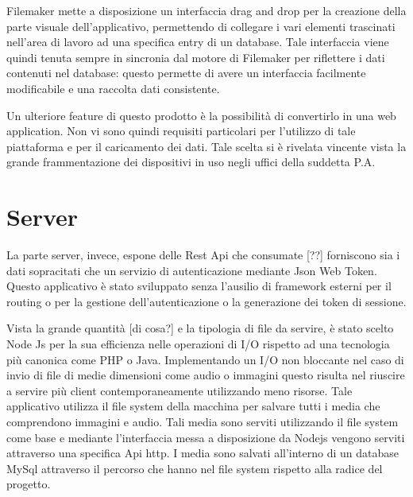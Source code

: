 Filemaker mette a disposizione un interfaccia drag and drop per la creazione della parte visuale dell'applicativo, permettendo di collegare i vari elementi trascinati nell'area di lavoro ad una specifica entry di un database. Tale interfaccia viene quindi tenuta sempre in sincronia dal motore di Filemaker per riflettere i dati contenuti nel database: questo permette di avere un interfaccia facilmente modificabile e una raccolta dati consistente.\vspace{5mm}

Un ulteriore feature di questo prodotto è la possibilità di convertirlo in una web application. Non vi sono quindi requisiti particolari per l'utilizzo di tale piattaforma e per il caricamento dei dati. Tale scelta si è rivelata vincente vista la grande frammentazione dei dispositivi in uso negli uffici della suddetta P.A.\vspace{5mm}


\section{Server}\vspace{5mm}
	
La parte server, invece, espone delle Rest Api che consumate [??] forniscono sia i dati sopracitati che un servizio di autenticazione mediante Json Web Token\cite{JWT}. Questo applicativo è stato sviluppato senza l’ausilio di framework esterni per il routing o per la gestione dell’autenticazione o la generazione dei token di sessione.\vspace{5mm}

 Vista la grande quantità [di cosa?] e la tipologia di file da servire, è stato scelto Node Js per la sua efficienza nelle operazioni di I/O rispetto ad una tecnologia più canonica come PHP\cite{PHP} o Java. Implementando un I/O non bloccante\cite{BlockingVsNonBlocking} nel caso di invio di file di medie dimensioni come audio o immagini questo risulta nel riuscire a servire più client contemporaneamente utilizzando meno risorse. Tale applicativo utilizza il file system della macchina per salvare tutti i media che comprendono immagini e audio. Tali media sono serviti utilizzando il file system come base e mediante l'interfaccia messa a disposizione da Nodejs vengono serviti attraverso una specifica Api http. I media sono salvati all'interno di un database MySql attraverso il percorso che hanno nel file system rispetto alla radice del progetto.\vspace{5mm}
 
